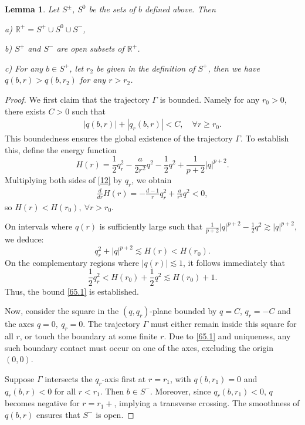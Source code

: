 \documentclass[12pt]{amsart}
\newcommand{\R}{\mathbb R}
\newtheorem{lemma}[theorem]{Lemma}
\begin{document}
\begin{lemma}\label{lm: b} 
Let $S^{\pm}$, $S^0$ be the sets of $b$ defined above. Then

a) $\R^+=S^+\cup S^0\cup S^-$,

b) $S^+$ and $S^-$ are open subsets of $\R^+$. 

c) For any $b\in S^+$, let $r_2$ be given in the definition of $S^+$, then we have $q(b,r)> q(b,r_2)$ for any $r > r_2$. 
\end{lemma}

\begin{proof} We first claim that the trajectory $\Gamma$ is bounded. Namely for any $r_0>0$, there exists $C>0$ such that
\begin{align}\label{65.1}
|q(b, r)|+|q_r(b, r)|<C, \quad \forall r\ge r_0. 
\end{align}
This boundedness ensures the global existence of the trajectory $\Gamma$. 
To establish this, define the energy function 
\begin{equation}\label{Hdef}
H(r)=\frac 12 q_r^2-\frac a{2r^2}q^2-\frac 12 q^2+\frac 1{p+2}|q|^{p+2}.
\end{equation}
Multiplying both sides of \eqref{12} by $q_r$, we obtain 
\begin{align}\label{66}
\frac d{dr}H(r)=-\frac{d-1} rq_r^2+\frac a{r^3}q^2<0,
\end{align}
so $H(r)<H(r_0), \ \forall r>r_0.$

On intervals where $q(r)$ is sufficiently large such that $\frac 1{p+2}|q|^{p+2}-\frac 12 q^2\gtrsim |q|^{p+2}$, we deduce: 
\[
q_r^2+|q|^{p+2}\lesssim H(r)< H(r_0).
\]
On the complementary regions where $|q(r)|\lesssim 1$, it follows immediately that 
\[
\frac 12 q_r^2< H(r_0)+\frac 12 q^2 \lesssim H(r_0)+ 1.
\]
Thus, the bound \eqref{65.1} is established. 

Now, consider the square in the $(q, q_r)$-plane bounded by $q=C$, $q_r=-C$ and the axes $q=0, \ q_r=0$. The trajectory $\Gamma$ must either remain inside this square for all $r$, or touch the boundary at some finite $r$. Due to \eqref{65.1} and uniqueness, any such boundary contact must occur on one of the axes, excluding the origin $(0,0)$. 

Suppose $\Gamma$ intersects the $q_r$-axis first at $r= r_1$,  
with $q(b,r_1)=0$ and $q_r(b,r)<0$ for all $r< r_1$. Then $b\in S^-$. Moreover, since $q_r(b,r_1)<0$, 
$q$ becomes negative for $r=r_1+$, implying a transverse crossing. The smoothness of $q(b,r)$ ensures that $S^-$ is open. 


\end{proof}
\end{document}
